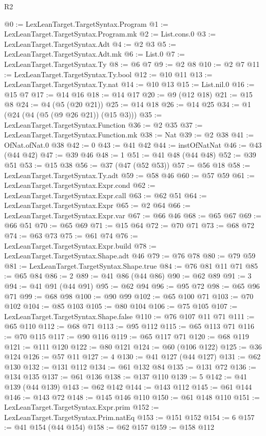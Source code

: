 \begin{lexlean}{R2}
\begin{coremodule}
@0 := LexLeanTarget.TargetSyntax.Program
@1 := LexLeanTarget.TargetSyntax.Program.mk
@2 := List.cons.{0}
@3 := LexLeanTarget.TargetSyntax.Adt
@4 := @2 @3
@5 := LexLeanTarget.TargetSyntax.Adt.mk
@6 := List.{0}
@7 := LexLeanTarget.TargetSyntax.Ty
@8 := @6 @7
@9 := @2 @8
@10 := @2 @7
@11 := LexLeanTarget.TargetSyntax.Ty.bool
@12 := @10 @11
@13 := LexLeanTarget.TargetSyntax.Ty.nat
@14 := @10 @13
@15 := List.nil.{0}
@16 := @15 @7
@17 := @14 @16
@18 := @14 @17
@20 := @9 (@12 @18)
@21 := @15 @8
@24 := @4 (@5 (@20 @21))
@25 := @14 @18
@26 := @14 @25
@34 := @1 (@24 (@4 (@5 (@9 @26 @21)) (@15 @3)))
@35 := LexLeanTarget.TargetSyntax.Function
@36 := @2 @35
@37 := LexLeanTarget.TargetSyntax.Function.mk
@38 := Nat
@39 := @2 @38
@41 := OfNat.ofNat.{0} @38
@42 := 0
@43 := @41 @42
@44 := instOfNatNat
@46 := @43 (@44 @42)
@47 := @39 @46
@48 := 1
@51 := @41 @48 (@44 @48)
@52 := @39 @51
@53 := @15 @38
@56 := @37 (@47 (@52 @53))
@57 := @56 @18
@58 := LexLeanTarget.TargetSyntax.Ty.adt
@59 := @58 @46
@60 := @57 @59
@61 := LexLeanTarget.TargetSyntax.Expr.cond
@62 := LexLeanTarget.TargetSyntax.Expr.call
@63 := @62 @51
@64 := LexLeanTarget.TargetSyntax.Expr
@65 := @2 @64
@66 := LexLeanTarget.TargetSyntax.Expr.var
@67 := @66 @46
@68 := @65 @67
@69 := @66 @51
@70 := @65 @69
@71 := @15 @64
@72 := @70 @71
@73 := @68 @72
@74 := @63 @73
@75 := @61 @74
@76 := LexLeanTarget.TargetSyntax.Expr.build
@78 := LexLeanTarget.TargetSyntax.Shape.adt @46
@79 := @76 @78
@80 := @79 @59
@81 := LexLeanTarget.TargetSyntax.Shape.true
@84 := @76 @81 @11 @71
@85 := @65 @84
@86 := 2
@89 := @41 @86 (@44 @86)
@90 := @62 @89
@91 := 3
@94 := @41 @91 (@44 @91)
@95 := @62 @94
@96 := @95 @72
@98 := @65 @96 @71
@99 := @68 @98
@100 := @90 @99
@102 := @65 @100 @71
@103 := @70 @102
@104 := @85 @103
@105 := @80 @104
@106 := @75 @105
@107 := LexLeanTarget.TargetSyntax.Shape.false
@110 := @76 @107 @11 @71
@111 := @65 @110
@112 := @68 @71
@113 := @95 @112
@115 := @65 @113 @71
@116 := @70 @115
@117 := @90 @116
@119 := @65 @117 @71
@120 := @68 @119
@121 := @111 @120
@122 := @80 @121
@124 := @60 (@106 @122)
@125 := @36 @124
@126 := @57 @11
@127 := 4
@130 := @41 @127 (@44 @127)
@131 := @62 @130
@132 := @131 @112
@134 := @61 @132 @84
@135 := @131 @72
@136 := @134 @135
@137 := @61 @136
@138 := @137 @110
@139 := 5
@142 := @41 @139 (@44 @139)
@143 := @62 @142
@144 := @143 @112
@145 := @61 @144
@146 := @143 @72
@148 := @145 @146 @110
@150 := @61 @148 @110
@151 := LexLeanTarget.TargetSyntax.Expr.prim
@152 := LexLeanTarget.TargetSyntax.Prim.natEq
@153 := @151 @152
@154 := 6
@157 := @41 @154 (@44 @154)
@158 := @62 @157
@159 := @158 @112

\end{coremodule}
\end{lexlean}
